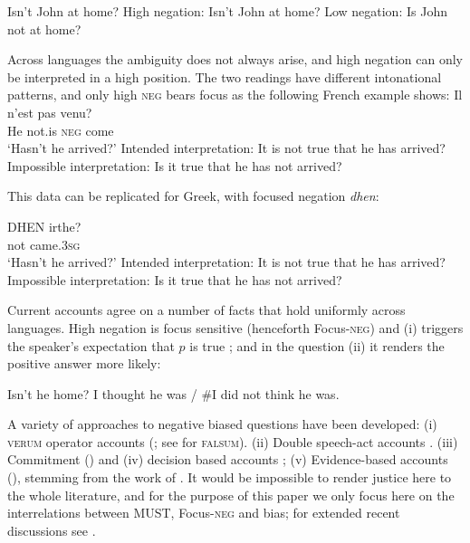 \documentclass[output=paper,colorlinks,citecolor=brown]{langscibook}
\begin{document}
\ea Isn't John at home? 
\ea High negation: Isn't John at home? 
\ex Low negation: Is John not at home? 
\z
\z


Across languages the ambiguity does not always arise, and high negation can only be interpreted in a high position. The two readings have different intonational patterns, and only high \textsc{neg} bears focus as the following French example shows:
\ea \label{frNBQfrench} \gll Il n'est pas venu? \\
He {not.is} \textsc{neg} come\\ 
\glt `Hasn't he arrived?'
\ea Intended interpretation:  It is not true that he has arrived?
\ex Impossible interpretation: Is it true that he has not arrived? 
\z
\z

This data can be replicated for Greek, with focused negation \textit{dhen}:


\ea \label{frNBQgreek}
\gll DHEN irthe? \\
  {not }  came\textsc{.3sg}\\
\glt `Hasn't he arrived?'
\ea Intended interpretation:  It is not true that he has arrived?
\ex Impossible interpretation: Is it true that he has not arrived? 
\z 
\z 


 Current accounts agree on a number of facts that hold uniformly across languages. High negation is focus sensitive (henceforth Focus-\textsc{neg}) and (i) triggers the speaker's expectation that $p$ is true ; and in the question (ii) it renders the positive answer more likely:


\ea \label{ex:02:Xabis} Isn't he home? I thought he was / \#I did not think he was.
\z





A variety of approaches to negative biased questions have been developed:
(i) \textsc{verum} operator accounts (\citealt{romero2004}; see \citealt{repp2013} for \textsc{falsum}).
(ii) Double speech-act accounts \citep{Reese2007}.
(iii) Commitment (\citealt{krifka2015SALT}) and
(iv) decision based accounts \citet{van2003};
(v) Evidence-based accounts (\citealt{buring2000, sudo2013, roelofsen2015, goodhue2018}), stemming from the work of \citet{Ladd1981}. It would be  impossible  to render justice here to the whole literature, and for the purpose of this paper we only focus here on the interrelations between \textsc{MUST}, Focus-\textsc{neg} and bias; for extended recent discussions see \citet{krifka2017, larrivee2022}.
\end{document}
